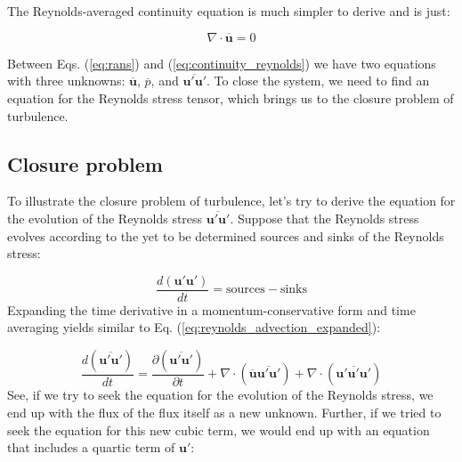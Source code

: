 \documentclass[12pt]{article}
\numberwithin{equation}{section}
\numberwithin{figure}{section}
\numberwithin{table}{section}
\begin{document}
The Reynolds-averaged continuity equation is much simpler to derive and is
just:

\begin{equation}
  \nabla \cdot \overline{\mathbf{u}} = 0
  \label{eq:continuity_reynolds}
\end{equation}

Between Eqs. (\ref{eq:rans}) and (\ref{eq:continuity_reynolds}) we have
two equations with three unknowns: $\overline{\mathbf{u}}$, $\overline{p}$, and
$\overline{\mathbf{u}' \mathbf{u}'}$.
To close the system, we need to find an equation for the Reynolds stress tensor,
which brings us to the closure problem of turbulence.

\subsection{Closure problem}

To illustrate the closure problem of turbulence, let's try to derive the
equation for the evolution of the Reynolds stress $\overline{\mathbf{u}' \mathbf{u}'}$.
Suppose that the Reynolds stress evolves according to the yet to be determined
sources and sinks of the Reynolds stress:

\begin{equation}
  \frac{d \left( \mathbf{u}' \mathbf{u}' \right)}{dt} =
  \text{sources} - \text{sinks}
  \label{eq:reynolds_stress_evolution}
\end{equation}
Expanding the time derivative in a momentum-conservative form and time averaging
yields similar to Eq. (\ref{eq:reynolds_advection_expanded}):

\begin{equation}
  \frac{d \left( \overline{\mathbf{u}' \mathbf{u}'} \right)}{dt} =
  \frac{\partial \left( \overline{\mathbf{u}' \mathbf{u}'} \right)}{\partial t} +
  \nabla \cdot \left( \overline{\mathbf{u}} \overline{\mathbf{u}' \mathbf{u}'} \right) +
  \nabla \cdot \left( \overline{\mathbf{u}' \mathbf{u}' \mathbf{u}'} \right)
\end{equation}
See, if we try to seek the equation for the evolution of the Reynolds stress,
we end up with the flux of the flux itself as a new unknown.
Further, if we tried to seek the equation for this new cubic term, we would
end up with an equation that includes a quartic term of $\mathbf{u}'$:
\end{document}
